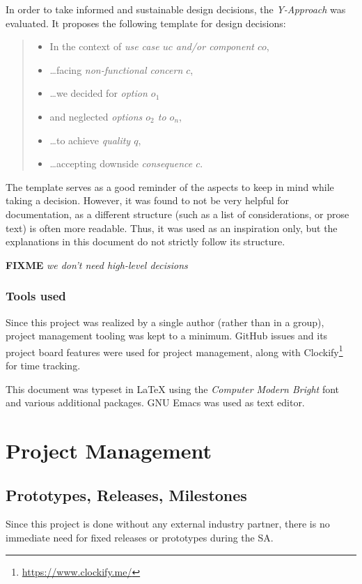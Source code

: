 \documentclass[a4paper,parskip=full,DIV=14,BCOR=15mm]{scrreprt}
\newcommand{\fixme}[1]{\textbf{FIXME} \emph{#1}}
\begin{document}
In order to take informed and sustainable design decisions, the
\emph{Y-Approach} \autocite{yapproach} was evaluated. It proposes the following
template for design decisions:

\begin{quote}
  \begin{itemize}
    \item In the context of \emph{use case $uc$ and/or component $co$},
    \item \ldots facing \emph{non-functional concern $c$},
    \item \ldots we decided for \emph{option $o_1$}
    \item and neglected \emph{options $o_2$ to $o_n$},
    \item \ldots to achieve \emph{quality $q$},
    \item \ldots accepting downside \emph{consequence $c$}.
  \end{itemize}
\end{quote}

The template serves as a good reminder of the aspects to keep in mind
while taking a decision. However, it was found to not be very helpful for
documentation, as a different structure (such as a list of considerations, or
prose text) is often more readable. Thus, it was used as an inspiration only,
but the explanations in this document do not strictly follow its structure.

\fixme{we don't need high-level decisions}

\subsection{Tools used}
Since this project was realized by a single author (rather than in a group),
project management tooling was kept to a minimum. GitHub issues and its project
board features were used for project management, along with
Clockify\footnote{\url{https://www.clockify.me/}} for time tracking.

This document was typeset in \LaTeX{} using the \emph{Computer Modern Bright}
font and various additional packages. GNU Emacs was used as text editor.

\chapter{Project Management}
\label{ch:projectman}

\section{Prototypes, Releases, Milestones}
Since this project is done without any external industry partner, there is no
immediate need for fixed releases or prototypes during the SA.
\end{document}
